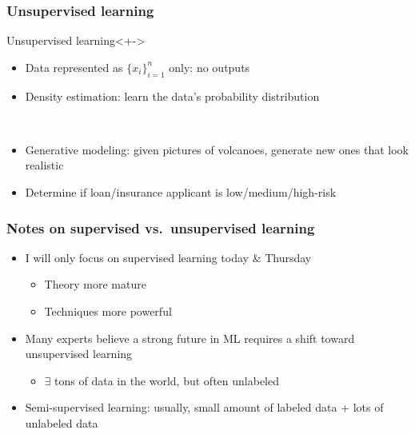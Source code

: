 \begin{frame}
    \frametitle{Unsupervised learning}
    \begin{block}{Unsupervised learning}<+->
        \begin{itemize}
            \item Data represented as $\{x_i\}_{i=1}^n$ only: no outputs
            \item \alert{Density estimation}: learn the data's probability distribution
        \end{itemize}
    \end{block}

     \\[1ex]

    \begin{itemize}[<.->]
        \item Generative modeling: given pictures of volcanoes, generate new ones that look realistic
        \item Determine if loan/insurance applicant is low/medium/high-risk
    \end{itemize}

\end{frame}

\begin{frame}
    \frametitle{Notes on supervised vs.~unsupervised learning}

    \begin{itemize}
        \item I will only focus on supervised learning today \& Thursday
        \begin{itemize}
            \item Theory more mature
            \item Techniques more powerful
        \end{itemize}
        \item Many experts believe a strong future in ML requires a shift toward unsupervised learning
        \begin{itemize}
            \item $\exists$ tons of data in the world, but often unlabeled
        \end{itemize}
        \item Semi-supervised learning: usually, small amount of labeled data + lots of unlabeled data
    \end{itemize}
\end{frame}

